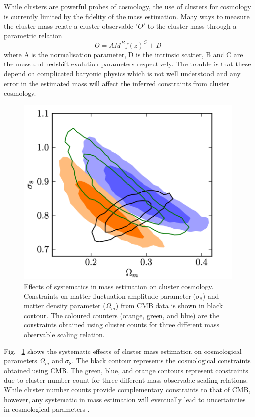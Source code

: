While clusters are powerful probes of cosmology, the use of clusters for cosmology is currently limited by the fidelity of the mass estimation. Many ways to measure the cluster mass relate a cluster observable $'O'$ to the cluster mass through a parametric relation 
\begin{equation}
O = A M^{B} f(z)^{C} +D
\label{obs-mass}
\end{equation} 
where A is the normalisation parameter, D is the intrinsic scatter, B and C are the mass and redshift evolution parameters respectively. The trouble is that these depend on complicated baryonic physics which is not well understood and any error in the estimated mass will affect the inferred constraints from cluster cosmology. 
\begin{figure}[H]
\includegraphics[width = \columnwidth]{figs/mass_cosmology.png}
\caption{Effects of systematics in mass estimation on cluster cosmology. Constraints on matter fluctuation amplitude parameter ($\sigma_{8}$) and matter density parameter ($\Omega_{m}$) from CMB data is shown in black contour. The coloured counters (orange, green, and blue) are the constraints obtained using cluster counts for three different mass observable scaling relation. }
\label{m_cosmo}
\end{figure}
Fig. ~\ref{m_cosmo} shows the systematic effects of cluster mass estimation on cosmological parameters $\Omega_{m}$ and $\sigma_{8}$. The black contour represents the cosmological constraints obtained using CMB.
The green, blue, and orange contours represent constraints due to cluster number count for three different mass-observable scaling relations.
While cluster number counts provide complementary constraints to that of CMB, however, any systematic in mass estimation will eventually lead to uncertainties in cosmological parameters \citep{hasselfield13}. 


